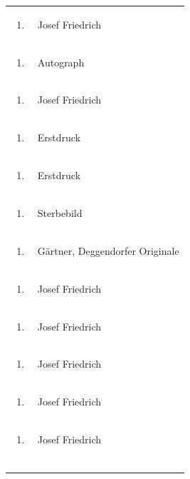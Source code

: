 \documentclass[a4paper]{article}
\begin{document}
\begin{flushleft}
\begin{supertabular}{m{1.2409999cm}m{14.604cm}}
\begin{enumerate}
\item
\end{enumerate}
 &
Josef Friedrich\\
\begin{enumerate}
\item
\end{enumerate}
 &
Autograph\\
\begin{enumerate}
\item
\end{enumerate}
 &
Josef Friedrich\\
\begin{enumerate}
\item
\end{enumerate}
 &
Erstdruck\\
\begin{enumerate}
\item
\end{enumerate}
 &
Erstdruck\\
\begin{enumerate}
\item
\end{enumerate}
 &
Sterbebild\\
\begin{enumerate}
\item
\end{enumerate}
 &
Gärtner, Deggendorfer Originale\\
\begin{enumerate}
\item
\end{enumerate}
 &
Josef Friedrich\\
\begin{enumerate}
\item
\end{enumerate}
 &
Josef Friedrich\\
\begin{enumerate}
\item
\end{enumerate}
 &
Josef Friedrich\\
\begin{enumerate}
\item
\end{enumerate}
 &
Josef Friedrich\\
\begin{enumerate}
\item
\end{enumerate}
 &
Josef Friedrich\\
\begin{enumerate}

\end{enumerate}
\end{supertabular}
\end{flushleft}
\end{document}
